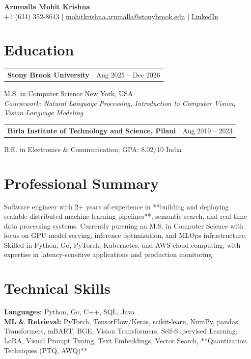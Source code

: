 \documentclass[letterpaper,10pt]{article}
\makeatletter
\newcommand{\entry}[2]{%
  \noindent
  \begin{tabularx}{\linewidth}
    {@{}>{\raggedright\arraybackslash}X@{\hspace{6pt}}r@{}}
    \textbf{#1} & #2
  \end{tabularx}\par
}
\makeatother
\begin{document}
\begin{center}
    {\LARGE\bfseries Arumalla Mohit Krishna}\\[3pt]
    +1 (631) 352-8643 $|$
    \href{mailto:mohitkrishna.arumalla@stonybrook.edu}
    {mohitkrishna.arumalla@stonybrook.edu} $|$
    \href{https://linkedin.com/in/mohit-krishna-arumalla}
    {LinkedIn}
\end{center}
\vspace{-8pt}

\section{Education}

\entry
  {Stony Brook University}
  {Aug 2025 -- Dec 2026}

M.S. in Computer Science \hfill New York, USA\\
\textit{
Coursework: Natural Language Processing,
Introduction to Computer Vision, Vision Language Modeling
}
\vspace{3pt}

\entry
  {Birla Institute of Technology and Science, Pilani}
  {Aug 2019 -- 2023}

B.E. in Electronics \& Communication; GPA: 8.02/10 \hfill India
\section{Professional Summary}

Software engineer with 2+ years of experience in **building and deploying scalable distributed machine learning pipelines**, semantic search, and real-time data processing systems. Currently pursuing an M.S. in Computer Science with focus on GPU model serving, inference optimization, and MLOps infrastructure. Skilled in Python, Go, PyTorch, Kubernetes, and AWS cloud computing, with expertise in latency-sensitive applications and production monitoring.

\section{Technical Skills}

\textbf{Languages:}
Python, Go, C++, SQL, Java\\

\textbf{ML \& Retrieval:}
PyTorch, TensorFlow/Keras, scikit-learn, NumPy, pandas,
Transformers, mBART, BGE, Vision Transformers,
Self-Supervised Learning, LoRA, Visual Prompt Tuning,
Text Embeddings, Vector Search, **Quantization Techniques (PTQ, AWQ)** \\
\end{document}
